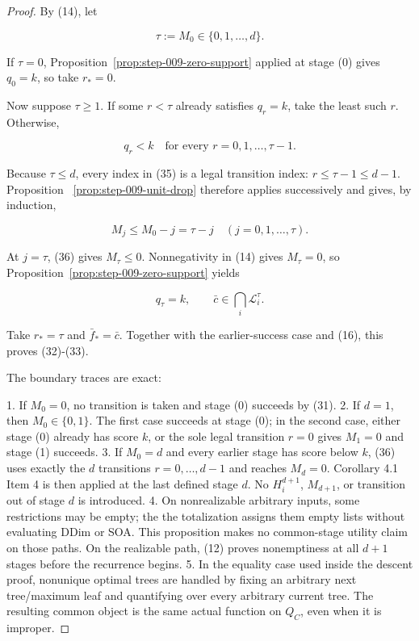 \begin{proof}
By (14), let

\[
 \tau:=M_0\in\{0,1,\ldots,d\}.
 \tag{34}
\]

If \(\tau=0\), Proposition~\ref{prop:step-009-zero-support} applied at
stage (0) gives \(q_0=k\), so take \(r_*=0\).

Now suppose \(\tau\ge1\). If some \(r<\tau\) already satisfies \(q_r=k\),
take the least such \(r\). Otherwise,

\[
 q_r<k\quad\text{for every }r=0,1,\ldots,\tau-1.
 \tag{35}
\]

Because \(\tau\le d\), every index in (35) is a legal transition index:
\(r\le\tau-1\le d-1\). Proposition
~\ref{prop:step-009-unit-drop} therefore applies successively and gives,
by induction,

\[
 M_j\le M_0-j=\tau-j
 \quad(j=0,1,\ldots,\tau).
 \tag{36}
\]

At \(j=\tau\), (36) gives \(M_\tau\le0\). Nonnegativity in (14) gives
\(M_\tau=0\), so Proposition~\ref{prop:step-009-zero-support} yields

\[
 q_\tau=k,
 \qquad
 \bar c\in\bigcap_i\mathcal L_i^\tau.
 \tag{37}
\]

Take \(r_*=\tau\) and \(\bar f_*=\bar c\). Together with the earlier-success
case and (16), this proves (32)-(33).

The boundary traces are exact:

1. If \(M_0=0\), no transition is taken and stage (0) succeeds by (31).
2. If \(d=1\), then \(M_0\in\{0,1\}\). The first case succeeds at stage
   (0); in the second case, either stage (0) already has score \(k\),
   or the sole legal transition \(r=0\) gives \(M_1=0\) and stage (1)
   succeeds.
3. If \(M_0=d\) and every earlier stage has score below \(k\), (36) uses
   exactly the \(d\) transitions \(r=0,\ldots,d-1\) and reaches
   \(M_d=0\). Corollary 4.1 Item 4 is then applied at the last defined
   stage \(d\). No \(H_i^{d+1}\), \(M_{d+1}\), or transition out of stage
   \(d\) is introduced.
4. On nonrealizable arbitrary inputs, some restrictions may be empty; the
    the totalization assigns them empty lists without evaluating DDim or
   SOA. This proposition makes no common-stage utility claim on those
   paths. On the realizable path, (12) proves nonemptiness at all \(d+1\)
   stages before the recurrence begins.
5. In the equality case used inside the descent proof, nonunique optimal
   trees are handled by fixing an arbitrary next tree/maximum leaf and
   quantifying over every arbitrary current tree. The resulting common
   object is the same actual function on \(Q_C\), even when it is
   improper.


\end{proof}
